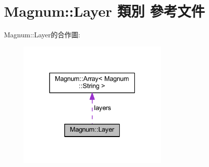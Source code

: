 \hypertarget{class_magnum_1_1_layer}{}\section{Magnum\+:\+:Layer 類別 參考文件}
\label{class_magnum_1_1_layer}


Magnum\+:\+:Layer的合作圖\+:\nopagebreak
\begin{figure}[H]
\begin{center}
\leavevmode
\includegraphics[width=210pt]{class_magnum_1_1_layer__coll__graph}
\end{center}
\end{figure}
